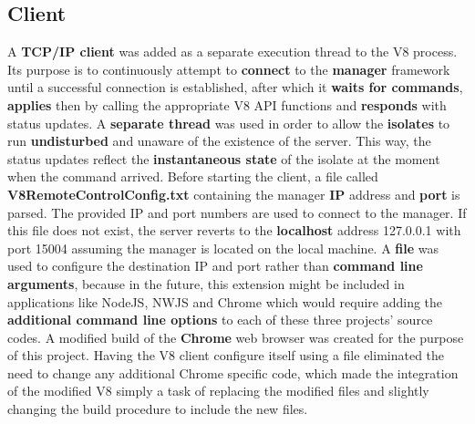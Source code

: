 \documentclass{l4proj}
\begin{document}
\subsection{Client}
\hspace*{3em} A \textbf{TCP/IP client} was added as a separate execution thread to the V8 process. Its purpose is to continuously attempt to \textbf{connect} to the \textbf{manager} framework until a successful connection is established, after which it \textbf{waits for commands}, \textbf{applies} then by calling the appropriate V8 API functions and \textbf{responds} with status updates. A \textbf{separate thread} was used in order to allow the \textbf{isolates} to run \textbf{undisturbed} and unaware of the existence of the server. This way, the status updates reflect the \textbf{instantaneous state} of the isolate at the moment when the command arrived. Before starting the client, a file called \textbf{V8RemoteControlConfig.txt} containing the manager \textbf{IP} address and \textbf{port} is parsed. The provided IP and port numbers are used to connect to the manager. If this file does not exist, the server reverts to the \textbf{localhost} address 127.0.0.1 with port 15004 assuming the manager is located on the local machine. A \textbf{file} was used to configure the destination IP and port rather than \textbf{command line arguments}, because in the future, this extension might be included in applications like NodeJS, NWJS and Chrome which would require adding the \textbf{additional command line options} to each of these three projects' source codes. A modified build of the \textbf{Chrome} web browser was created for the purpose of this project. Having the V8 client configure itself using a file eliminated the need to change any additional Chrome specific code, which made the integration of the modified V8 simply a task of replacing the modified files and slightly changing the build procedure to include the new files. %
\end{document}

